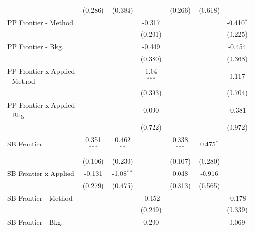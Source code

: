 \begin{tabular}{lcccccc}
                                  & (0.286)       & (0.384)      &                & (0.266)       & (0.618)     &   \\   
   PP Frontier - Method           &               &              & -0.317         &               &             & -0.410$^{*}$\\   
                                  &               &              & (0.201)        &               &             & (0.225)\\   
   PP Frontier - Bkg.             &               &              & -0.449         &               &             & -0.454\\   
                                  &               &              & (0.380)        &               &             & (0.368)\\   
   PP Frontier x Applied - Method &               &              & 1.04$^{***}$   &               &             & 0.117\\   
                                  &               &              & (0.393)        &               &             & (0.704)\\   
   PP Frontier x Applied - Bkg.   &               &              & 0.090          &               &             & -0.381\\   
                                  &               &              & (0.722)        &               &             & (0.972)\\   
   SB Frontier                    & 0.351$^{***}$ & 0.462$^{**}$ &                & 0.338$^{***}$ & 0.475$^{*}$ &   \\   
                                  & (0.106)       & (0.230)      &                & (0.107)       & (0.280)     &   \\   
   SB Frontier x Applied          & -0.131        & -1.08$^{**}$ &                & 0.048         & -0.916      &   \\   
                                  & (0.279)       & (0.475)      &                & (0.313)       & (0.565)     &   \\   
   SB Frontier - Method           &               &              & -0.152         &               &             & -0.178\\   
                                  &               &              & (0.249)        &               &             & (0.339)\\   
   SB Frontier - Bkg.             &               &              & 0.200          &               &             & 0.069\\   

\end{tabular}
